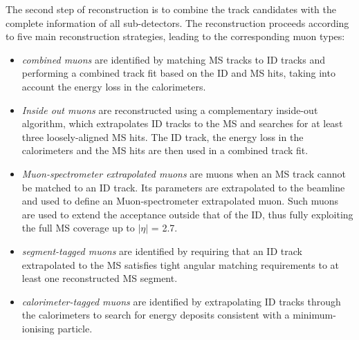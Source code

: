 The second step of reconstruction is to combine the track candidates 
with the complete information of all sub-detectors.
The reconstruction proceeds according to five main
reconstruction strategies, leading to the corresponding muon
types: 
\begin{itemize}
\item \textit{combined muons} 
are identified by matching 
MS tracks to ID tracks and performing a combined track fit 
based on the ID and MS hits, taking into account the energy loss in the
calorimeters.
\item \textit{Inside out muons} 
are reconstructed using a complementary
inside-out algorithm, which extrapolates ID tracks to the MS
and searches for at least three loosely-aligned MS hits. The
ID track, the energy loss in the calorimeters and the MS hits
are then used in a combined track fit. 
\item \textit{Muon-spectrometer extrapolated muons} are muons 
when an MS track cannot be matched to an ID track. Its parameters 
are extrapolated to the beamline and used to define an
Muon-spectrometer extrapolated muon. 
Such muons are used to extend the acceptance
outside that of the ID, thus fully exploiting the full MS 
coverage up to $|\eta|$ = 2.7.
\item \textit{segment-tagged muons} 
are identified by requiring that an ID track
extrapolated to the MS satisfies tight angular matching
requirements to at least one reconstructed MS segment. 
\item \textit{calorimeter-tagged muons} 
are identified by extrapolating ID
tracks through the calorimeters to search for energy deposits
consistent with a minimum-ionising particle.
\end{itemize}
